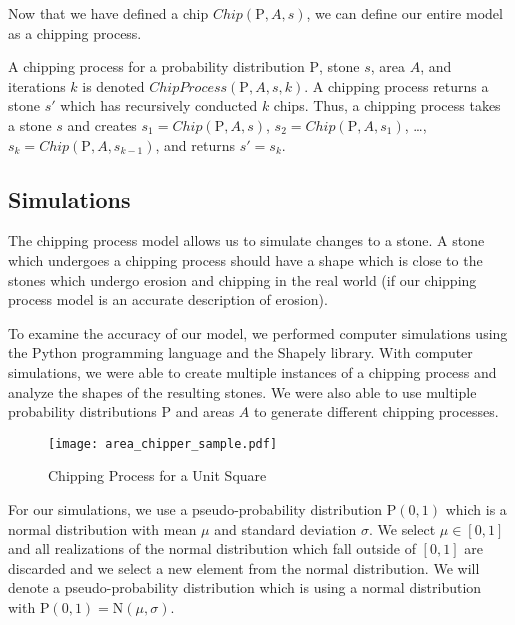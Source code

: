 Now that we have defined a chip $Chip(\mathrm{P}, A, s)$, we can define our entire model as a chipping process.

\begin{definition}
A chipping process for a probability distribution $\mathrm{P}$, stone $s$, area $A$, and iterations $k$ is denoted $ChipProcess(\mathrm{P}, A, s, k)$. A chipping process returns a stone $s'$ which has recursively conducted $k$ chips. Thus, a chipping process takes a stone $s$ and creates $s_1 = Chip(\mathrm{P}, A, s)$, $s_2 = Chip(\mathrm{P}, A, s_1)$, \ldots, $s_k = Chip(\mathrm{P}, A, s_{k-1})$, and returns $s' = s_k$.
\end{definition}

\subsection{Simulations}

The chipping process model allows us to simulate changes to a stone. A stone which undergoes a chipping process should have a shape which is close to the stones which undergo erosion and chipping in the real world (if our chipping process model is an accurate description of erosion).

To examine the accuracy of our model, we performed computer simulations using the Python programming language and the Shapely library. With computer simulations, we were able to create multiple instances of a chipping process and analyze the shapes of the resulting stones. We were also able to use multiple probability distributions $\mathrm{P}$ and areas $A$ to generate different chipping processes.

\begin{figure}
  \begin{center}
    \texttt{[image: area\_chipper\_sample.pdf]}
  \end{center}
  \caption{Chipping Process for a Unit Square \label{fig:area_chipper_sample}}
\end{figure}


For our simulations, we use a pseudo-probability distribution $\mathrm{P}(0,1)$ which is a normal distribution with mean $\mu$ and standard deviation $\sigma$. We select $\mu \in [0,1]$ and all realizations of the normal distribution which fall outside of $[0,1]$ are discarded and we select a new element from the normal distribution. We will denote a pseudo-probability distribution which is using a normal distribution with $\mathrm{P}(0,1) = \mathrm{N}(\mu, \sigma)$.


